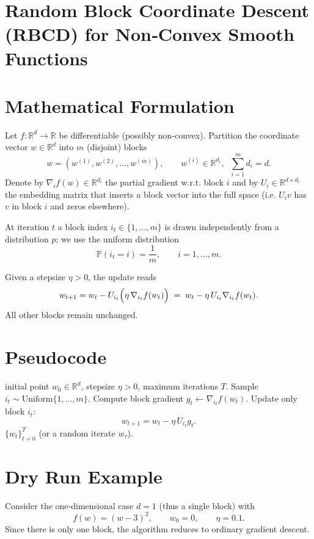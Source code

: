 \documentclass{article}
\newcommand{\R}{\mathbb{R}}
\begin{document}
\section*{Random Block Coordinate Descent (RBCD) for Non‑Convex Smooth Functions}

\section*{Mathematical Formulation}
Let $f:\R^{d}\rightarrow\R$ be differentiable (possibly non‑convex).  
Partition the coordinate vector $w\in\R^{d}$ into $m$ (disjoint) blocks
\[
w=(w^{(1)},w^{(2)},\dots ,w^{(m)}),\qquad 
w^{(i)}\in\R^{d_i},\;\;\sum_{i=1}^{m}d_i=d .
\]
Denote by $\nabla_i f(w)\in\R^{d_i}$ the partial gradient w.r.t. block $i$ and by $U_i\in\R^{d\times d_i}$ the embedding matrix that inserts a block vector into the full space (i.e. $U_i v$ has $v$ in block $i$ and zeros elsewhere).

At iteration $t$ a block index $i_t\in\{1,\dots,m\}$ is drawn independently
from a distribution $p$; we use the uniform distribution
\[
\mathbb{P}(i_t=i)=\frac1m,\qquad i=1,\dots,m .
\]

Given a stepsize $\eta>0$, the update reads
\begin{equation}
\label{eq:update}
w_{t+1}=w_t-U_{i_t}\Bigl(\eta\,\nabla_{i_t}f(w_t)\Bigr)
\;=\;
w_t-\eta\,U_{i_t}\nabla_{i_t}f(w_t) .
\end{equation}
All other blocks remain unchanged.

\section*{Pseudocode}
\begin{algorithm}[H]
\caption{Random Block Coordinate Descent (RBCD)}
\begin{algorithmic}[1]
 initial point $w_0\in\R^{d}$, stepsize $\eta>0$, 
maximum iterations $T$.
    \STATE Sample $i_t\sim\text{Uniform}\{1,\dots,m\}$.
    \STATE Compute block gradient $g_t\gets\nabla_{i_t}f(w_t)$.
    \STATE Update only block $i_t$:
    \[
    w_{t+1}=w_t-\eta\,U_{i_t}g_t .
    \]
\ENDFOR
{} $\{w_t\}_{t=0}^{T}$ (or a random iterate $w_{\tau}$).
\end{algorithmic}
\end{algorithm}

\section*{Dry Run Example}
Consider the one‑dimensional case $d=1$ (thus a single block) with
\[
f(w)=(w-3)^2,\qquad w_0=0,\qquad \eta=0.1 .
\]
Since there is only one block, the algorithm reduces to ordinary gradient descent.
\end{document}

